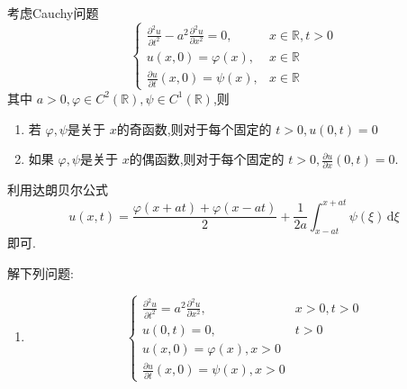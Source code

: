 \documentclass[../../PDE.tex]{subfiles}
\begin{document}
\begin{proposition}
    考虑Cauchy问题 \[
    \begin{cases} \frac{\partial ^{2}u}{\partial t^{2}}-a^{2}\frac{\partial ^{2}u}{\partial x^{2}}= 0,&x\in \mathbb{R} ,t> 0\\ 
     u\left( x,0 \right)=  \varphi \left( x \right),& x \in \mathbb{R} \\ 
      \frac{\partial u}{\partial t}\left( x,0 \right)= \psi \left( x \right),&x\in \mathbb{R}      \end{cases} 
    \]其中 \(  a> 0, \varphi \in C^{2}\left( \mathbb{R}  \right),\psi \in C^{1}\left( \mathbb{R}  \right)    \),则
    \begin{enumerate}
        \item 若 \(   \varphi ,\psi   \)是关于 \(  x  \)的奇函数,则对于每个固定的 \(  t> 0, u\left( 0,t \right)= 0   \)
        \item 如果 \(   \varphi ,\psi   \)是关于 \(  x  \)的偶函数,则对于每个固定的 \(  t> 0, \frac{\partial u}{\partial x}\left( 0,t \right)= 0   \).      
    \end{enumerate}
     
\end{proposition}
\begin{note}
    利用达朗贝尔公式 \[
    u\left( x,t \right)= \frac{ \varphi \left( x+ at \right)+  \varphi \left( x-at \right)   }{2 }+ \frac{1 }{2a }\int_{x-at}^{x+ at}\psi \left(  \xi  \right)\,\mathrm{d}  \xi     
    \]即可.
\end{note}

\begin{problem}
    解下列问题: 
    \begin{enumerate}
        \item \[
        \begin{cases} \frac{\partial ^{2}u}{\partial t^{2}}= a^{2}\frac{\partial ^{2}u}{\partial x^{2}},&x> 0,t> 0\\ 
         u\left( 0,t \right)= 0,&t> 0\\ 
          u\left( x,0 \right)=  \varphi \left( x \right),x> 0\\ 
           \frac{\partial u}{\partial t}\left( x,0 \right)= \psi \left( x \right)      ,x> 0\end{cases} 
        \]
    \end{enumerate}
    
\end{problem}
\end{document}
